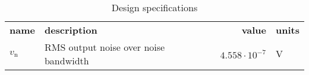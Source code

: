 \begin{table}[H]
\centering
\begin{tabular}[c]{llrl}
\textbf{name} & \textbf{description} & \textbf{value} & \textbf{units} \\ 
\rowcolor{myyellow}
$v_{\mathrm{n}}$ &\small{RMS output noise over noise bandwidth} &$4.558 \cdot 10^{-7}$ &$\mathrm{V}$ \\ 
\end{tabular}
\caption{Design specifications}
\label{tab-design}
\end{table}


